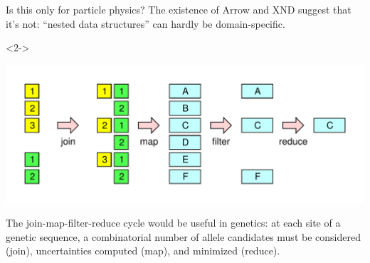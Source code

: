 \documentclass[aspectratio=169]{beamer}
\begin{document}
\begin{frame}{Is this only for particle physics?}
\large
\vspace{0.5 cm}
The existence of Arrow and XND suggest that it's not: ``nested data structures'' can hardly be domain-specific.

\vspace{-0.15 cm}
\begin{uncoverenv}<2->
\begin{center}
\includegraphics[width=0.6\linewidth]{explode-flat-reduce.pdf}
\end{center}

\vspace{-0.35 cm}
The join-map-filter-reduce cycle would be useful in genetics: at each site of a genetic sequence, a combinatorial number of allele candidates must be considered (join), uncertainties computed (map), and minimized (reduce).
\end{uncoverenv}

\vspace{0.5 cm}
\end{frame}
\end{document}

